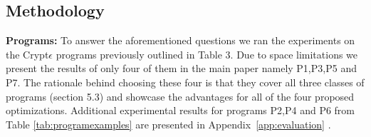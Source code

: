 \subsection{Methodology} 
\textbf{Programs:}
To answer the aforementioned questions we ran the experiments on the Crypt$\epsilon$ programs previously outlined in Table 3. Due to space limitations we present the results of only four of them in the main paper namely P1,P3,P5 and P7. The rationale behind choosing these four is that they cover all three classes of programs (section 5.3) and showcase the advantages for all of the four proposed optimizations. %
Additional experimental results for programs P2,P4 and P6 from Table \ref{tab:programexamples} are presented in Appendix~\ref{app:evaluation} .%
